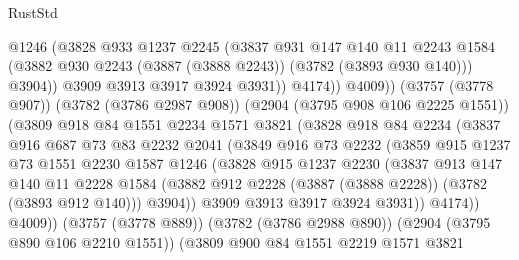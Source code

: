 \begin{lexlean}{RustStd}
\begin{coremodule}
                          @1246
                          (@3828
                            @933
                            @1237
                            @2245
                            (@3837
                              @931
                              @147
                              @140
                              @11
                              @2243
                              @1584
                              (@3882 @930 @2243 (@3887 (@3888 @2243)) (@3782 (@3893 @930 @140)))
                              @3904))
                          @3909
                          @3913
                          @3917
                          @3924
                          @3931))
                      @4174))
                  @4009))
              (@3757 (@3778 @907))
              (@3782 (@3786 @2987 @908))
              (@2904 (@3795 @908 @106 @2225 @1551))
              (@3809
                @918
                @84
                @1551
                @2234
                @1571
                @3821
                (@3828
                  @918
                  @84
                  @2234
                  (@3837
                    @916
                    @687
                    @73
                    @83
                    @2232
                    @2041
                    (@3849
                      @916
                      @73
                      @2232
                      (@3859
                        @915
                        @1237
                        @73
                        @1551
                        @2230
                        @1587
                        @1246
                        (@3828
                          @915
                          @1237
                          @2230
                          (@3837
                            @913
                            @147
                            @140
                            @11
                            @2228
                            @1584
                            (@3882 @912 @2228 (@3887 (@3888 @2228)) (@3782 (@3893 @912 @140)))
                            @3904))
                        @3909
                        @3913
                        @3917
                        @3924
                        @3931))
                    @4174))
                @4009))
            (@3757 (@3778 @889))
            (@3782 (@3786 @2988 @890))
            (@2904 (@3795 @890 @106 @2210 @1551))
            (@3809
              @900
              @84
              @1551
              @2219
              @1571
              @3821

\end{coremodule}
\end{lexlean}
